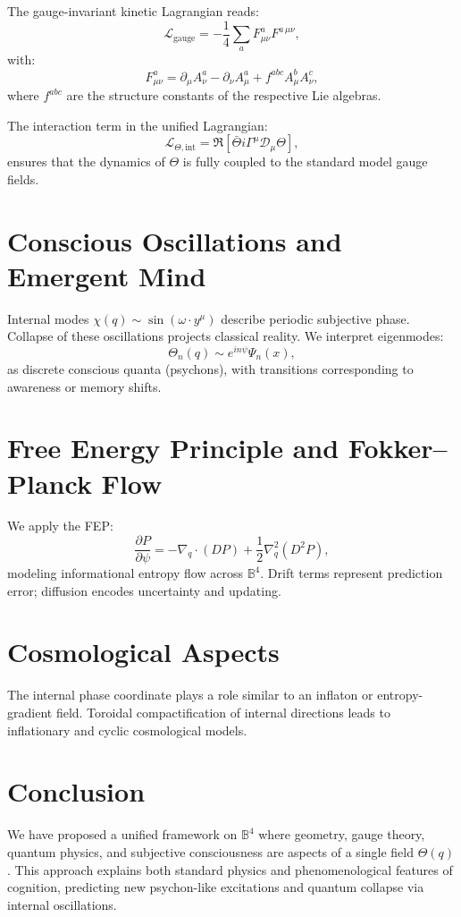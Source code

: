 \documentclass[12pt]{article}
\begin{document}
The gauge-invariant kinetic Lagrangian reads:
\[
\mathcal{L}_{\text{gauge}} = -\frac{1}{4} \sum_a F^{a}_{\mu\nu} F^{a\,\mu\nu},
\]
with:
\[
F^a_{\mu\nu} = \partial_\mu A^a_\nu - \partial_\nu A^a_\mu + f^{abc} A^b_\mu A^c_\nu,
\]
where \(f^{abc}\) are the structure constants of the respective Lie algebras.

The interaction term in the unified Lagrangian:
\[
\mathcal{L}_{\Theta, \text{int}} = \Re \left[ \bar{\Theta} i \Gamma^\mu \mathcal{D}_\mu \Theta \right],
\]
ensures that the dynamics of \(\Theta\) is fully coupled to the standard model gauge fields.


\section{Conscious Oscillations and Emergent Mind}

Internal modes \( \chi(q) \sim \sin(\omega \cdot y^\mu) \) describe periodic subjective phase. Collapse of these oscillations projects classical reality. We interpret eigenmodes:
\[
\Theta_n(q) \sim e^{i n \psi} \Psi_n(x),
\]
as discrete conscious quanta (psychons), with transitions corresponding to awareness or memory shifts.

\section{Free Energy Principle and Fokker–Planck Flow}

We apply the FEP:
\[
\frac{\partial P}{\partial \psi} = -\nabla_q \cdot (D P) + \frac{1}{2} \nabla_q^2 (D^2 P),
\]
modeling informational entropy flow across \( \mathbb{B}^4 \). Drift terms represent prediction error; diffusion encodes uncertainty and updating.

\section{Cosmological Aspects}

The internal phase coordinate plays a role similar to an inflaton or entropy-gradient field. Toroidal compactification of internal directions leads to inflationary and cyclic cosmological models.

\section{Conclusion}

We have proposed a unified framework on \( \mathbb{B}^4 \) where geometry, gauge theory, quantum physics, and subjective consciousness are aspects of a single field \( \Theta(q) \). This approach explains both standard physics and phenomenological features of cognition, predicting new psychon-like excitations and quantum collapse via internal oscillations.
\end{document}
